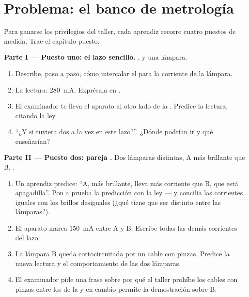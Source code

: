 \section{Problema: el banco de metrología}

\begin{problem}\label{pb:g8:intensity-ammeter:1}
Para ganarse los privilegios del taller, cada aprendiz recorre cuatro
puestos de medida. Trae el capítulo puesto.

\medskip\noindent\textbf{Parte I --- Puesto uno: el lazo sencillo.}
,  y una lámpara.
\begin{enumerate}
  \item Describe, paso a paso, cómo intercalar el
         para  la corriente de la
        lámpara.
  \item La lectura: \qty{280}{mA}. Exprésala en .
  \item El examinador te lleva el aparato al otro lado de la
        . Predice la lectura, citando la ley.
  \item ``¿Y si tuviera dos  a la vez en este
        lazo?''. ¿Dónde podrían ir y qué enseñarían?
\end{enumerate}

\medskip\noindent\textbf{Parte II --- Puesto dos: pareja .}
Dos lámparas distintas, A más brillante que B, .
\begin{enumerate}[resume]
  \item Un aprendiz predice: ``A, más brillante, lleva más corriente
        que B, que está apagadilla''. Pon a prueba la predicción con
        la ley --- y concilia las corrientes iguales con los brillos
        desiguales (¿qué tiene que ser distinto entre las lámparas?).
  \item El aparato marca \qty{150}{mA} entre A y B. Escribe todas
        las demás corrientes del lazo.
  \item La lámpara B queda cortocircuitada por un cable con
        pinzas. Predice la nueva lectura y el comportamiento de las
        dos lámparas.
  \item El examinador pide una frase sobre por qué el taller prohíbe
        los cables con pinzas entre los  de la
        \emph{} y en cambio permite la demostración sobre
        B.
\end{enumerate}


\end{problem}
